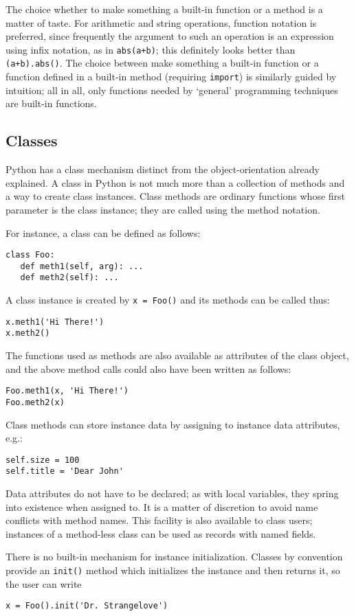 The choice whether to make something a built-in function or a method
is a matter of taste.  For arithmetic and string operations, function
notation is preferred, since frequently the argument to such an
operation is an expression using infix notation, as in {\tt abs(a+b)};
this definitely looks better than {\tt (a+b).abs()}.  The choice
between make something a built-in function or a function defined in a
built-in method (requiring {\tt import}) is similarly guided by
intuition; all in all, only functions needed by `general' programming
techniques are built-in functions.

\subsection{Classes}

Python has a class mechanism distinct from the object-orientation
already explained.  A class in Python is not much more than a
collection of methods and a way to create class instances.  Class
methods are ordinary functions whose first parameter is the class
instance; they are called using the method notation.

For instance, a class can be defined as follows:
\begin{verbatim}
class Foo:
   def meth1(self, arg): ...
   def meth2(self): ...
\end{verbatim}
A class instance is created by
{\tt x = Foo()}
and its methods can be called thus:
\begin{verbatim}
x.meth1('Hi There!')
x.meth2()
\end{verbatim}
The functions used as methods are also available as attributes of the
class object, and the above method calls could also have been written
as follows:
\begin{verbatim}
Foo.meth1(x, 'Hi There!')
Foo.meth2(x)
\end{verbatim}
Class methods can store instance data by assigning to instance data
attributes, e.g.:
\begin{verbatim}
self.size = 100
self.title = 'Dear John'
\end{verbatim}
Data attributes do not have to be declared; as with local variables,
they spring into existence when assigned to.  It is a matter of
discretion to avoid name conflicts with method names.  This facility
is also available to class users; instances of a method-less class can
be used as records with named fields.

There is no built-in mechanism for instance initialization.  Classes
by convention provide an {\tt init()} method which initializes the
instance and then returns it, so the user can write
\begin{verbatim}
x = Foo().init('Dr. Strangelove')
\end{verbatim}

